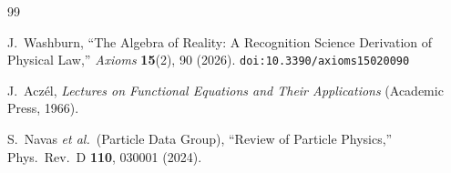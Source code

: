 \documentclass[12pt,a4paper]{article}
\theoremstyle{definition}
\theoremstyle{remark}
\begin{document}
\begin{thebibliography}{99}

J.~Washburn, ``The Algebra of Reality: A Recognition Science Derivation
of Physical Law,'' \emph{Axioms} \textbf{15}(2), 90 (2026).
\texttt{doi:10.3390/axioms15020090}

J.~Acz\'el, \emph{Lectures on Functional Equations and Their
Applications} (Academic Press, 1966).

S.~Navas \textit{et al.}\ (Particle Data Group),
``Review of Particle Physics,'' Phys.\ Rev.\ D \textbf{110}, 030001
(2024).

\end{thebibliography}
\end{document}
